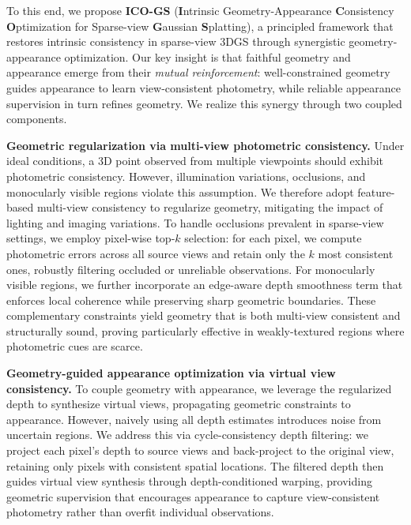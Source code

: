 To this end, we propose \textbf{ICO-GS} (\textbf{I}ntrinsic Geometry-Appearance 
\textbf{C}onsistency \textbf{O}ptimization for Sparse-view \textbf{G}aussian 
\textbf{S}platting), a principled framework that restores intrinsic consistency 
in sparse-view 3DGS through synergistic geometry-appearance optimization.
Our key insight is that faithful geometry and appearance emerge from their 
\emph{mutual reinforcement}: well-constrained geometry guides appearance to 
learn view-consistent photometry, while reliable appearance supervision in 
turn refines geometry.
We realize this synergy through two coupled components.


\textbf{Geometric regularization via multi-view photometric consistency.}
Under ideal conditions, a 3D point observed from multiple viewpoints should 
exhibit photometric consistency. However, illumination variations, occlusions, 
and monocularly visible regions violate this assumption. 
We therefore adopt feature-based multi-view consistency to regularize geometry, 
mitigating the impact of lighting and imaging variations. 
To handle occlusions prevalent in sparse-view settings, we employ pixel-wise 
top-$k$ selection: for each pixel, we compute photometric errors across all 
source views and retain only the $k$ most consistent ones, robustly filtering 
occluded or unreliable observations. 
For monocularly visible regions, we further incorporate an edge-aware depth 
smoothness term that enforces local coherence while preserving sharp geometric 
boundaries. 
These complementary constraints yield geometry that is both multi-view consistent 
and structurally sound, proving particularly effective in weakly-textured 
regions where photometric cues are scarce.

\textbf{Geometry-guided appearance optimization via virtual view consistency.}
To couple geometry with appearance, we leverage the regularized depth to 
synthesize virtual views, propagating geometric constraints to appearance.
However, naively using all depth estimates introduces noise from uncertain regions.
We address this via cycle-consistency depth filtering: we project each pixel's 
depth to source views and back-project to the original view, retaining only 
pixels with consistent spatial locations.
The filtered depth then guides virtual view synthesis through depth-conditioned 
warping, providing geometric supervision that encourages appearance to capture 
view-consistent photometry rather than overfit individual observations.


